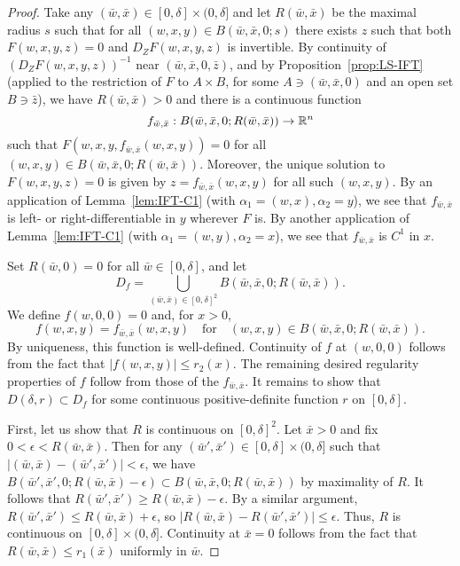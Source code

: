 \begin{proof}
Take any $(\bar w, \bar x) \in [0, \delta] \times (0, \delta]$
and let $R(\bar w, \bar x)$ be the maximal radius $s$ such that
for all $(w, x, y) \in B(\bar w, \bar x, 0; s)$ there exists $z$
such that both $F(w, x, y, z) = 0$ and $D_Z F(w, x, y, z)$ is
invertible. By continuity of $(D_Z F(w, x, y, z))^{-1}$ near
$(\bar w, \bar x, 0, \bar z)$, and by Proposition~\ref{prop:LS-IFT}
(applied to the restriction of $F$ to $A \times B$, for some
$A \ni (\bar w, \bar x, 0)$ and an open set $B \ni \bar z$),
we have $R(\bar w, \bar x) > 0$ and there is a continuous function
\begin{equation}
f_{\bar w,\bar x} : B(\bar w, \bar x, 0; R(\bar w, \bar x)) \rightarrow {\mathbb R}^n
\end{equation}
such that $F(w, x, y, f_{\bar w,\bar x}(w, x, y)) = 0$
for all $(w, x, y) \in B(\bar w, \bar x, 0; R(\bar w, \bar x))$.
Moreover, the unique solution to $F(w, x, y, z) = 0$
is given by $z = f_{\bar w,\bar x}(w, x, y)$ for all such $(w, x, y)$.
By an application of Lemma~\ref{lem:IFT-C1}
(with $\alpha_1 = (w, x), \alpha_2 = y$),
we see that $f_{\bar w, \bar x}$ is
left- or right-differentiable in $y$ wherever $F$ is.
By another application of Lemma~\ref{lem:IFT-C1} (with $\alpha_1 = (w, y), \alpha_2 = x$),
we see that $f_{\bar w, \bar x}$ is $C^1$ in $x$.

Set $R(\bar w, 0) = 0$ for all $\bar w \in [0, \delta]$, and
let
\begin{equation}
D_f = \bigcup_{(\bar w,\bar x)\in [0, \delta]^2} B(\bar w, \bar x, 0; R(\bar w, \bar x)).
\end{equation}
We define $f(w, 0, 0) = 0$ and, for $x > 0$,
\begin{equation}
f(w, x, y) = f_{\bar w,\bar x}(w, x, y)
  \quad\text{for}\quad
(w, x, y) \in B(\bar w, \bar x, 0; R(\bar w, \bar x)).
\end{equation}
By uniqueness, this function is well-defined.
Continuity of $f$ at $(w, 0, 0)$
follows from the fact that $|f(w, x, y)| \le r_2(x)$.
The remaining desired regularity properties of $f$
follow from those of the $f_{\bar w,\bar x}$.
It remains to show that $D(\delta,r) \subset D_f$
for some continuous positive-definite function $r$ on $[0, \delta]$.

First, let us show that $R$ is continuous on $[0, \delta]^2$.
Let $\bar x > 0$ and fix $0 < \epsilon < R(\bar w, \bar x)$.
Then for any $(\bar w', \bar x') \in [0,\delta] \times (0, \delta]$ such that
$|(\bar w, \bar x) - (\bar w', \bar x')| < \epsilon$,
we have $B(\bar w', \bar x', 0; R(\bar w, \bar x) - \epsilon) \subset B(\bar w, \bar x, 0; R(\bar w, \bar x))$
by maximality of $R$.
It follows that $R(\bar w', \bar x') \geq R(\bar w, \bar x) - \epsilon$.
By a similar argument, $R(\bar w', \bar x') \leq R(\bar w, \bar x) + \epsilon$,
so $|R(\bar w, \bar x) - R(\bar w', \bar x')| \leq \epsilon$.
Thus, $R$ is continuous on $[0, \delta] \times (0, \delta]$.
Continuity at $\bar x = 0$ follows from the fact that $R(\bar w, \bar x) \le r_1(\bar x)$
uniformly in $\bar w$.


\end{proof}
